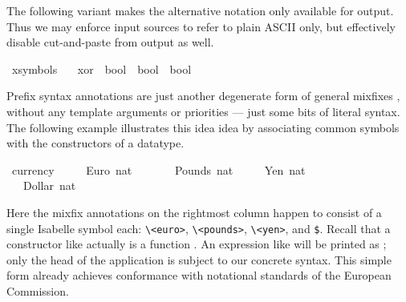 \begin{isabellebody}
\begin{isamarkuptext}
  \medskip The following variant makes the alternative \isa{{\isasymoplus}}
  notation only available for output.  Thus we may enforce input
  sources to refer to plain ASCII only, but effectively disable
  cut-and-paste from output as well.%
\end{isamarkuptext}%
\isamarkuptrue%
\ {\isacharparenleft}xsymbols\ \isanewline
\ \ xor\ {\isacharcolon}{\isacharcolon}\ {\isachardoublequote}bool\ {\isasymRightarrow}\ bool\ {\isasymRightarrow}\ bool{\isachardoublequote}\ \ \ \ {\isacharparenleft}\ {\isachardoublequote}{\isasymoplus}{\isasymignore}{\isachardoublequote}\ {}{}{\isacharparenright}\isamarkupfalse%
%
\isamarkuptrue%
%
\begin{isamarkuptext}%
Prefix syntax annotations are just another
  degenerate form of general mixfixes \cite{isabelle-ref}, without any
  template arguments or priorities --- just some bits of literal
  syntax.  The following example illustrates this idea idea by
  associating common symbols with the constructors of a datatype.%
\end{isamarkuptext}%
\isamarkuptrue%
\ currency\ {\isacharequal}\isanewline
\ \ \ \ Euro\ nat\ \ \ \ {\isacharparenleft}{\isachardoublequote}{\isasymeuro}{\isachardoublequote}{\isacharparenright}\isanewline
\ \ {\isacharbar}\ Pounds\ nat\ \ {\isacharparenleft}{\isachardoublequote}{\isasympounds}{\isachardoublequote}{\isacharparenright}\isanewline
\ \ {\isacharbar}\ Yen\ nat\ \ \ \ \ {\isacharparenleft}{\isachardoublequote}{\isasymyen}{\isachardoublequote}{\isacharparenright}\isanewline
\ \ {\isacharbar}\ Dollar\ nat\ \ {\isacharparenleft}{\isachardoublequote}{\isachardollar}{\isachardoublequote}{\isacharparenright}\isamarkupfalse%
%
\begin{isamarkuptext}%
\noindent Here the mixfix annotations on the rightmost column happen
  to consist of a single Isabelle symbol each: \verb,\,\verb,<euro>,,
  \verb,\,\verb,<pounds>,, \verb,\,\verb,<yen>,, and \verb,$,.  Recall
  that a constructor like  actually is a function .  An expression like  will be
  printed as ; only the head of the application is
  subject to our concrete syntax.  This simple form already achieves
  conformance with notational standards of the European Commission.


\end{isamarkuptext}
\end{isabellebody}
